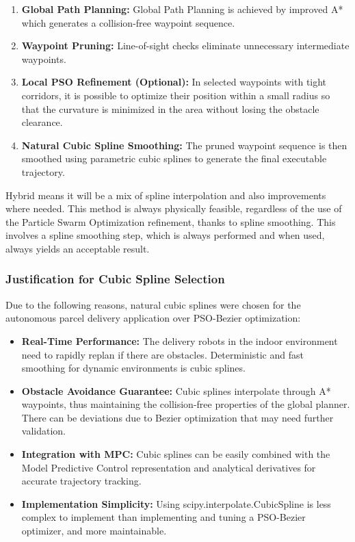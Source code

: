 \begin{enumerate}[noitemsep]
\item \textbf{Global Path Planning:} Global Path Planning is achieved by improved A* which generates a collision-free waypoint sequence.
\item \textbf{Waypoint Pruning:} Line-of-sight checks eliminate unnecessary intermediate waypoints.
\item \textbf{Local PSO Refinement (Optional):}  In selected waypoints with tight corridors, it is possible to optimize their position within a small radius so that the curvature is minimized in the area without losing the obstacle clearance.
\item \textbf{Natural Cubic Spline Smoothing:} The pruned waypoint sequence is then smoothed using parametric cubic splines to generate the final executable trajectory.
\end{enumerate}

Hybrid means it will be a mix of spline interpolation and also improvements where needed. This method is always physically feasible, regardless of the use of the Particle Swarm Optimization refinement, thanks to spline smoothing. This involves a spline smoothing step, which is always performed and when used, always yields an acceptable result.

\subsubsection{Justification for Cubic Spline Selection}

Due to the following reasons, natural cubic splines were chosen for the autonomous parcel delivery application over PSO-Bezier optimization:

\begin{itemize}[noitemsep]
\item \textbf{Real-Time Performance:} The delivery robots in the indoor environment need to rapidly replan if there are obstacles. Deterministic and fast smoothing for dynamic environments is cubic splines.

\item \textbf{Obstacle Avoidance Guarantee:} Cubic splines interpolate through A* waypoints, thus maintaining the collision-free properties of the global planner. There can be deviations due to Bezier optimization that may need further validation.

\item \textbf{Integration with MPC:} Cubic splines can be easily combined with the Model Predictive Control representation and analytical derivatives for accurate trajectory tracking.

\item \textbf{Implementation Simplicity:} Using scipy.interpolate.CubicSpline is less complex to implement than implementing and tuning a PSO-Bezier optimizer, and more maintainable.
\end{itemize}

